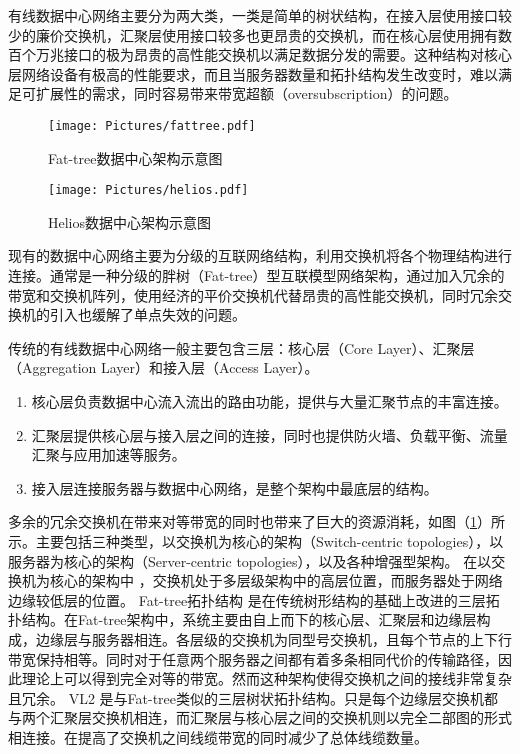 有线数据中心网络主要分为两大类，一类是简单的树状结构，在接入层使用接口较少的廉价交换机，汇聚层使用接口较多也更昂贵的交换机，而在核心层使用拥有数百个万兆接口的极为昂贵的高性能交换机以满足数据分发的需要。这种结构对核心层网络设备有极高的性能要求，而且当服务器数量和拓扑结构发生改变时，难以满足可扩展性的需求，同时容易带来带宽超额（oversubscription）的问题。

\begin{figure}[t]
	\centering
	\texttt{[image: Pictures/fattree.pdf]}
	\caption{Fat-tree数据中心架构示意图}
	\label{fig:ft}
\end{figure}

\begin{figure}[t]
	\centering
	\texttt{[image: Pictures/helios.pdf]}
	\caption{Helios数据中心架构示意图}
	\label{fig:helios}
\end{figure}


现有的数据中心网络主要为分级的互联网络结构，利用交换机将各个物理结构进行连接\cite{xia2017survey,chen2016features}。通常是一种分级的胖树（Fat-tree）型互联模型网络架构，通过加入冗余的带宽和交换机阵列，使用经济的平价交换机代替昂贵的高性能交换机，同时冗余交换机的引入也缓解了单点失效的问题。

传统的有线数据中心网络一般主要包含三层：核心层（Core Layer）、汇聚层（Aggregation Layer）和接入层（Access Layer）。
\begin{enumerate}
	\item 核心层负责数据中心流入流出的路由功能，提供与大量汇聚节点的丰富连接。
	\item 汇聚层提供核心层与接入层之间的连接，同时也提供防火墙、负载平衡、流量汇聚与应用加速等服务。
	\item 接入层连接服务器与数据中心网络，是整个架构中最底层的结构。
\end{enumerate}

多余的冗余交换机在带来对等带宽的同时也带来了巨大的资源消耗，如图（\ref{fig:ft}）所示。主要包括三种类型，以交换机为核心的架构（Switch-centric topologies），以服务器为核心的架构（Server-centric topologies），以及各种增强型架构。
在以交换机为核心的架构中 \cite{singla2012jellyfish,walraed2013aspen}，交换机处于多层级架构中的高层位置，而服务器处于网络边缘较低层的位置。
Fat-tree拓扑结构 \cite{al2008scalable}是在传统树形结构的基础上改进的三层拓扑结构。在Fat-tree架构中，系统主要由自上而下的核心层、汇聚层和边缘层构成，边缘层与服务器相连。各层级的交换机为同型号交换机，且每个节点的上下行带宽保持相等。同时对于任意两个服务器之间都有着多条相同代价的传输路径，因此理论上可以得到完全对等的带宽。然而这种架构使得交换机之间的接线非常复杂且冗余。
VL2 \cite{greenberg2009vl2}是与Fat-tree类似的三层树状拓扑结构。只是每个边缘层交换机都与两个汇聚层交换机相连，而汇聚层与核心层之间的交换机则以完全二部图的形式相连接。在提高了交换机之间线缆带宽的同时减少了总体线缆数量。

